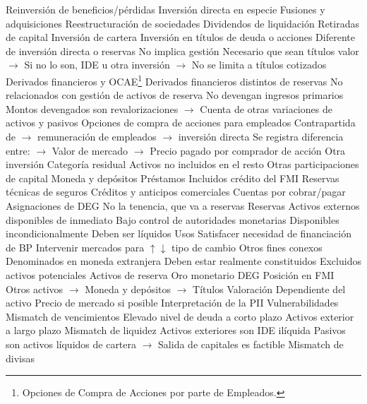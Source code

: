 \documentclass{nuevotema}
\begin{document}
\begin{esquemal}
				\4[] Reinversión de beneficios/pérdidas
				\4[] Inversión directa en especie
				\4[] Fusiones y adquisiciones
				\4[] Reestructuración de sociedades
				\4[] Dividendos de liquidación
				\4[] Retiradas de capital
			\3 Inversión de cartera
				\4 Inversión en títulos de deuda o acciones
				\4[] Diferente de inversión directa o reservas
				\4[] No implica gestión
				\4[] Necesario que sean títulos valor
				\4[] $\to$ Si no lo son, IDE u otra inversión
				\4[] $\to$ No se limita a títulos cotizados
			\3 Derivados financieros y OCAE\footnote{Opciones de Compra de Acciones por parte de Empleados.}
				\4 Derivados financieros distintos de reservas
				\4[] No relacionados con gestión de activos de reserva
				\4 No devengan ingresos primarios
				\4[] Montos devengados son revalorizaciones
				\4[] $\to$ Cuenta de otras variaciones de activos y pasivos
				\4 Opciones de compra de acciones para empleados
				\4[] Contrapartida de
				\4[] $\to$ remuneración de empleados
				\4[] $\to$ inversión directa
				\4[] Se registra diferencia entre:
				\4[] $\to$ Valor de mercado
				\4[] $\to$ Precio pagado por comprador de acción
			\3 Otra inversión
				\4 Categoría residual
				\4[] Activos no incluidos en el resto
				\4 Otras participaciones de capital
				\4 Moneda y depósitos
				\4 Préstamos
				\4[] Incluidos crédito del FMI
				\4 Reservas técnicas de seguros
				\4 Créditos y anticipos comerciales
				\4 Cuentas por cobrar/pagar
				\4 Asignaciones de DEG
				\4[] No la tenencia, que va a reservas
			\3 Reservas
				\4 Activos externos disponibles de inmediato
				\4[] Bajo control de autoridades monetarias
				\4[] Disponibles incondicionalmente
				\4[] Deben ser líquidos
				\4 Usos
				\4[] Satisfacer necesidad de financiación de BP
				\4[] Intervenir mercados para $\uparrow \downarrow$ tipo de cambio
				\4[] Otros fines conexos
				\4 Denominados en moneda extranjera
				\4 Deben estar realmente constituidos
				\4[] Excluidos activos potenciales
				\4 Activos de reserva
				\4[] Oro monetario
				\4[] DEG
				\4[] Posición en FMI
				\4[] Otros activos
				\4[] $\to$ Moneda y depósitos
				\4[] $\to$ Títulos
			\3 Valoración
				\4 Dependiente del activo
				\4 Precio de mercado si posible
		\2 Interpretación de la PII
			\3 Vulnerabilidades
				\4 Mismatch de vencimientos
				\4[] Elevado nivel de deuda a corto plazo
				\4[] Activos exterior a largo plazo
				\4 Mismatch de liquidez
				\4[] Activos exteriores son IDE ilíquida
				\4[] Pasivos son activos líquidos de cartera
				\4[] $\to$ Salida de capitales es factible
				\4 Mismatch de divisas

\end{esquemal}
\end{document}
